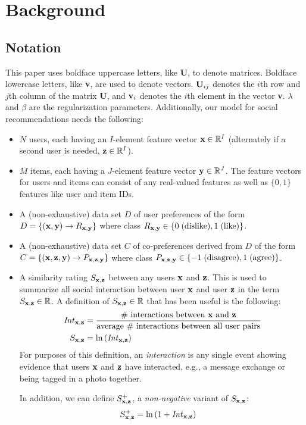 
\chapter{Background}

\section{Notation}

This paper uses boldface uppercase letters, like {\bf U}, to denote matrices. Boldface lowercase letters, like {\bf v}, are used to denote vectors.  ${\bf U}_{ij}$ denotes the $i$th row and $j$th column of the matrix {\bf U}, and ${\bf v}_{i}$ denotes the $i$th element in the vector {\bf v}. $\lambda$ and $\beta$ are the regularization parameters. Additionally, our model for social recommendations needs the following:

\begin{itemize}
\item $N$ users, each having an $I$-element feature vector 
$\mathbf{x} \in \mathbb{R}^I$ (alternately if a second user is needed, $\mathbf{z} \in \mathbb{R}^I$).

\item $M$ items, each having a $J$-element feature vector 
$\mathbf{y} \in \mathbb{R}^J$. The feature vectors for users 
and items can consist of any real-valued features as well as $\{0,1\}$
features like user and item IDs.

\item A (non-exhaustive) data set $D$ of user preferences of the form
$D = \{ (\mathbf{x}, \mathbf{y}) \to R_{\mathbf{x},\mathbf{y}} \}$ where class 
$R_{\mathbf{x},\mathbf{y}} \in \{ 0 \; \mbox{(dislike)}, 1 \; \mbox{(like)} \}$.

\item A (non-exhaustive) data set $C$ of co-preferences derived from $D$ of the form
$C = \{ (\mathbf{x}, \mathbf{z}, \mathbf{y}) \to P_{\mathbf{x}, \mathbf{z}, \mathbf{y}} \}$ where class 
$P_{\mathbf{x}, \mathbf{z}, \mathbf{y}} \in \{ -1 \; \mbox{(disagree)}, 1 \;\mbox{(agree)} \}$.  

\item A similarity rating $S_{\mathbf{x},\mathbf{z}}$ between any users $\mathbf{x}$ and $\mathbf{z}$. This is used to summarize all social
interaction between user $\mathbf{x}$ and user $\mathbf{z}$ in the term $S_{\mathbf{x},\mathbf{z}} \in
\mathbb{R}$.  A definition of $S_{\mathbf{x},\mathbf{z}} \in \mathbb{R}$ that has been useful is the
following:
\begin{align}
\mathit{Int}_{\mathbf{x},\mathbf{z}} & = \frac{\mbox{\# interactions between $\mathbf{x}$
and $\mathbf{z}$}}{\mbox{average \# interactions between all user pairs}}\\
S_{\mathbf{x},\mathbf{z}} & = \ln \left( \mathit{Int}_{\mathbf{x},\mathbf{z}} \right)
\end{align}
For purposes of this definition, an \emph{interaction} is any single event
showing evidence that users $\mathbf{x}$ and $\mathbf{z}$ have 
interacted, e.g., a message exchange or being tagged in a photo together.

In addition, we can define $S^+_{\mathbf{x},\mathbf{z}}$, a \emph{non-negative} 
variant of $S_{\mathbf{x},\mathbf{z}}$:
\begin{align}
S^+_{\mathbf{x},\mathbf{z}} & = \ln \left( 1 + \mathit{Int}_{\mathbf{x},\mathbf{z}} \right)
\end{align}
\end{itemize}

